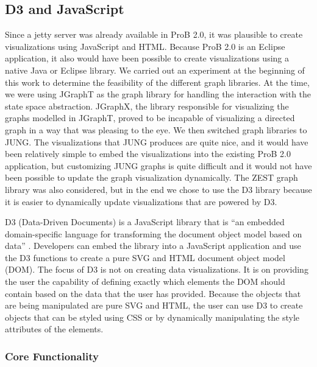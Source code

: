 \subsection{D3 and JavaScript}

Since a jetty server was already available in ProB 2.0, it was plausible to create visualizations using JavaScript and HTML. Because ProB 2.0 is an Eclipse application, it also would have been possible to create visualizations using a native Java or Eclipse library. We carried out an experiment at the beginning of this work to determine the feasibility of the different graph libraries. At the time, we were using JGraphT as the graph library for handling the interaction with the state space abstraction. JGraphX, the library responsible for visualizing the graphs modelled in JGraphT, proved to be incapable of visualizing a directed graph in a way that was pleasing to the eye. We then switched graph libraries to JUNG. The visualizations that JUNG produces are quite nice, and it would have been relatively simple to embed the visualizations into the existing ProB 2.0 application, but customizing JUNG graphs is quite difficult and it would not have been possible to update the graph visualization dynamically. The ZEST graph library was also considered, but in the end we chose to use the D3 library because it is easier to dynamically update visualizations that are powered by D3. 

D3 (Data-Driven Documents) is a JavaScript library that is ``an embedded domain-specific language for transforming the document object model based on data'' \cite{2011-d3}. Developers can embed the library into a JavaScript application and use the D3 functions to create a pure SVG and HTML document object model (DOM). The focus of D3 is not on creating data visualizations. It is on providing the user the capability of defining exactly which elements the DOM should contain based on the data that the user has provided. Because the objects that are being manipulated are pure SVG and HTML, the user can use D3 to create objects that can be styled using CSS or by dynamically manipulating the style attributes of the elements.

\subsubsection{Core Functionality}

